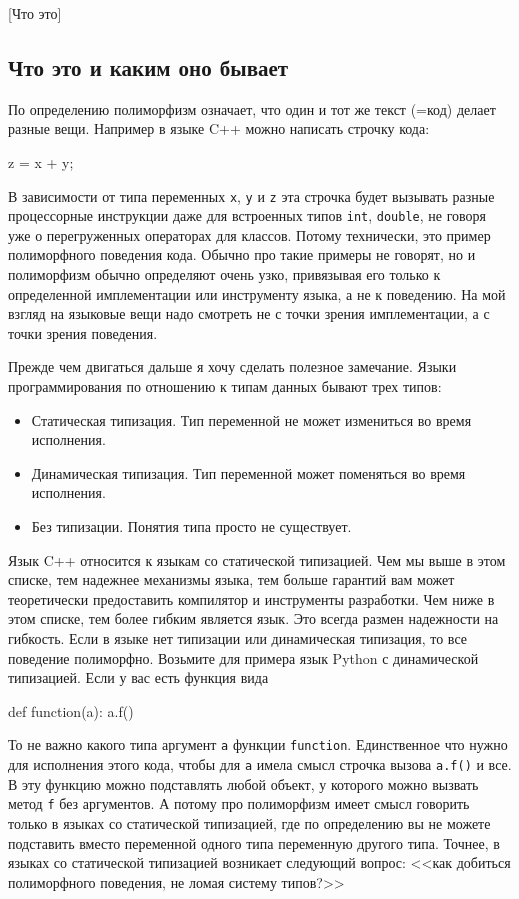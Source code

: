 [Что это]


\subsection{Что это и каким оно бывает}

По определению полиморфизм означает, что один и тот же текст (=код) делает разные вещи.
Например в языке C++ можно написать строчку кода:
\begin{cppcode}
z = x + y;
\end{cppcode}
В зависимости от типа переменных \texttt{x}, \texttt{y} и \texttt{z} эта строчка будет вызывать разные процессорные инструкции даже для встроенных типов \texttt{int}, \texttt{double}, не говоря уже о перегруженных операторах для классов.
Потому технически, это пример полиморфного поведения кода.
Обычно про такие примеры не говорят, но и полиморфизм обычно определяют очень узко, привязывая его только к определенной имплементации или инструменту языка, а не к поведению.
На мой взгляд на языковые вещи надо смотреть не с точки зрения имплементации, а с точки зрения поведения.

Прежде чем двигаться дальше я хочу сделать полезное замечание.
Языки программирования по отношению к типам данных бывают трех типов:
\begin{itemize}
\item Статическая типизация.
Тип переменной не может измениться во время исполнения.

\item Динамическая типизация.
Тип переменной может поменяться во время исполнения.

\item Без типизации.
Понятия типа просто не существует.
\end{itemize}
Язык C++ относится к языкам со статической типизацией.
Чем мы выше в этом списке, тем надежнее механизмы языка, тем больше гарантий вам может теоретически предоставить компилятор и инструменты разработки.
Чем ниже в этом списке, тем более гибким является язык.
Это всегда размен надежности на гибкость.
Если в языке нет типизации или динамическая типизация, то все поведение полиморфно.
Возьмите для примера язык Python с динамической типизацией.
Если у вас есть функция вида
\begin{pythoncode}
def function(a):
  a.f()
\end{pythoncode}
То не важно какого типа аргумент \texttt{a} функции \texttt{function}.
Единственное что нужно для исполнения этого кода, чтобы для \texttt{a} имела смысл строчка вызова \texttt{a.f()} и все.
В эту функцию можно подставлять любой объект, у которого можно вызвать метод \texttt{f} без аргументов.
А потому про полиморфизм имеет смысл говорить только в языках со статической типизацией, где по определению вы не можете подставить вместо переменной одного типа переменную другого типа.
Точнее, в языках со статической типизацией возникает следующий вопрос: <<как добиться полиморфного поведения, не ломая систему типов?>>

